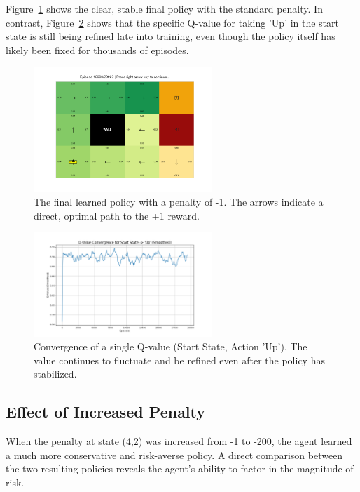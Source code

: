 \documentclass{article}
\begin{document}
Figure~\ref{fig:policy_heatmap} shows the clear, stable final policy with the standard penalty. In contrast, Figure~\ref{fig:q_convergence} shows that the specific Q-value for taking 'Up' in the start state is still being refined late into training, even though the policy itself has likely been fixed for thousands of episodes.

\begin{figure}[H]
    \centering
    \includegraphics[width=0.6\textwidth]{../results/qpolicy_visualizatoin_heatmapt.png}
    \caption{The final learned policy with a penalty of -1. The arrows indicate a direct, optimal path to the +1 reward.}
    \label{fig:policy_heatmap}
\end{figure}

\begin{figure}[H]
    \centering
    \includegraphics[width=0.6\textwidth]{../results/qvalue_vs_episodes.png}
    \caption{Convergence of a single Q-value (Start State, Action 'Up'). The value continues to fluctuate and be refined even after the policy has stabilized.}
    \label{fig:q_convergence}
\end{figure}

\subsection{Effect of Increased Penalty}
When the penalty at state (4,2) was increased from -1 to -200, the agent learned a much more conservative and risk-averse policy. A direct comparison between the two resulting policies reveals the agent's ability to factor in the magnitude of risk.
\end{document}
